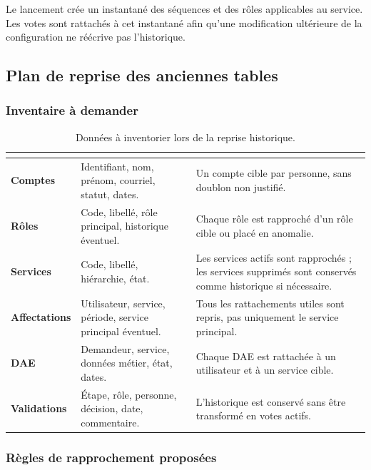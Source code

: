 Le lancement crée un instantané des séquences et des rôles applicables au service. Les votes sont rattachés à cet instantané afin qu'une modification ultérieure de la configuration ne réécrive pas l'historique.

\subsection{Plan de reprise des anciennes tables}

\subsubsection{Inventaire à demander}

\begin{table}[htbp]
\centering
\scriptsize
\begin{tabularx}{\textwidth}{>{\bfseries}p{}Yp{0.3\textwidth}}
\toprule
{}
 &  &  \\
\midrule
Comptes & Identifiant, nom, prénom, courriel, statut, dates. & Un compte cible par personne, sans doublon non justifié. \\
Rôles & Code, libellé, rôle principal, historique éventuel. & Chaque rôle est rapproché d'un rôle cible ou placé en anomalie. \\
Services & Code, libellé, hiérarchie, état. & Les services actifs sont rapprochés ; les services supprimés sont conservés comme historique si nécessaire. \\
Affectations & Utilisateur, service, période, service principal éventuel. & Tous les rattachements utiles sont repris, pas uniquement le service principal. \\
DAE & Demandeur, service, données métier, état, dates. & Chaque DAE est rattachée à un utilisateur et à un service cible. \\
Validations & Étape, rôle, personne, décision, date, commentaire. & L'historique est conservé sans être transformé en votes actifs. \\
\bottomrule
\end{tabularx}
\caption{Données à inventorier lors de la reprise historique.}
\label{tab:inventaire-reprise}
\end{table}

\subsubsection{Règles de rapprochement proposées}

